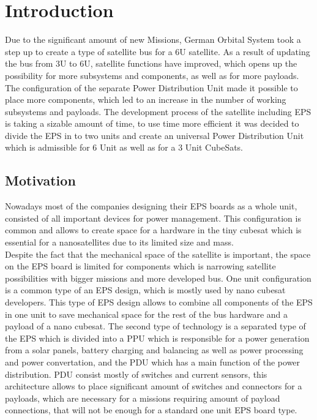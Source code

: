 \chapter{Introduction\label{cha:chapter1}}
Due to the significant amount of new Missions, German Orbital System took a step up to create a type of satellite bus for a 6U satellite.  As a result of updating the bus from 3U to 6U, satellite functions have improved, which opens up the possibility for more subsystems and components, as well as for more payloads. The configuration of the separate Power Distribution Unit made it possible to place more components, which led to an increase in the number of working subsystems and payloads. The development process of the satellite including EPS is taking a sizable amount of time, to use time more efficient it was decided to divide the EPS in to two units and create an universal Power Distribution Unit which is admissible for 6 Unit as well as for a 3 Unit CubeSats. 
 

\section{Motivation\label{sec:moti}}
Nowadays most of the companies designing their EPS boards as a whole unit, consisted of all important devices for power management. This configuration is common and allows to create space for a hardware in the tiny cubesat which is essential for a nanosatellites due to its limited size and mass. 
\\  Despite the fact that the mechanical space of the satellite is important, the space on the EPS board is limited for components which is narrowing satellite possibilities with bigger missions and more developed bus.
One unit configuration is a common type of an EPS design, which is mostly used by nano cubesat developers. This type of EPS design allows to combine all components of the EPS in one unit to save mechanical space for the rest of the bus hardware and a payload of a nano cubesat. The second type of technology is a separated type of the EPS which is divided into a PPU which is responsible for a power generation from a solar panels, battery charging and balancing as well as power processing and power convertation, and the PDU which has a main function of the power distribution. PDU consist mostly of switches and current sensors, this architecture allows to place significant amount of switches and connectors for a payloads, which are necessary for a missions requiring amount of payload connections, that will not be enough for a standard one unit EPS board type.\\

